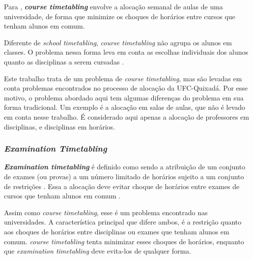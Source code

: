 Para , \textit{\textbf{course timetabling}} envolve a alocação semanal de aulas de uma universidade, de forma que minimize os choques de horários entre cursos que tenham alunos em comum.

Diferente de \textit{school timetabling}, \textit{course timetabling} não agrupa os alunos em classes. O problema nessa forma leva em conta as escolhas individuais dos alunos quanto as disciplinas a serem cursadas \cite{kingston2004tiling}.

Este trabalho trata de um problema de \textit{course timetabling}, mas são levadas em conta problemas encontrados no processo de alocação da UFC-Quixadá. Por esse motivo, o problema abordado aqui tem algumas diferenças do problema em sua forma tradicional. Um exemplo é a alocação em salas de aulas, que não é levado em conta nesse trabalho. É considerado aqui apenas a alocação de professores em disciplinas, e disciplinas em horários. 

\subsubsection{\textit{Examination Timetabling}}

\textbf{\textit{Examination timetabling}} é definido como sendo a atribuição de um conjunto de exames (ou provas) a um número limitado de horários sujeito a um conjunto de restrições \cite{yang2004novel}. Essa a alocação deve evitar choque de horários entre exames de cursos que tenham alunos em comum \cite{schaerf1999survey}.

Assim como \textit{course timetabling}, esse é um problema encontrado nas universidades. A característica principal que difere ambos, é a restrição quanto aos choques de horários entre disciplinas ou exames que tenham alunos em comum. \textit{course timetabling} tenta minimizar esses choques de horários, enquanto que \textit{examination timetabling} deve evita-los de qualquer forma.
